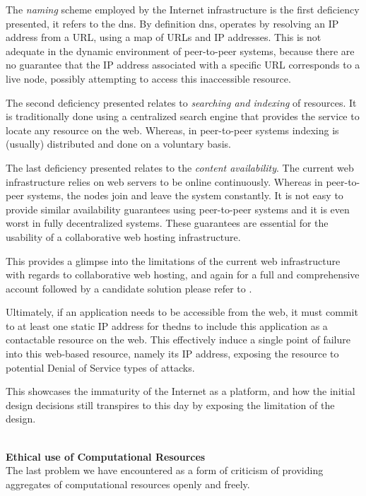 \documentclass[12pt, titlepage]{uo_temp}
\begin{document}
     The \emph{naming} scheme employed by the Internet infrastructure is the first
     deficiency presented, it refers to the \gls{dns}. By definition \gls{dns}, operates
     by resolving an IP address from a URL, using a map of URLs and IP addresses. This is
     not adequate in the dynamic environment of peer-to-peer systems, because there are no
     guarantee that the IP address associated with a specific URL corresponds to a live
     node, possibly attempting to access this inaccessible resource.

     The second deficiency presented relates to \emph{searching and indexing} of
     resources. It is traditionally done using a centralized search engine that provides
     the service to locate any resource on the web. Whereas, in peer-to-peer systems
     indexing is (usually) distributed and done on a voluntary basis.

     The last deficiency presented relates to the \emph{content availability}. The current
     web infrastructure relies on web servers to be online continuously.  Whereas in
     peer-to-peer systems, the nodes join and leave the system constantly. It is not easy
     to provide similar availability guarantees using peer-to-peer systems and it is even
     worst in fully decentralized systems. These guarantees are essential for the
     usability of a collaborative web hosting infrastructure.

     This provides a glimpse into the limitations of the current web infrastructure with
     regards to collaborative web hosting, and again for a full and comprehensive account
     followed by a candidate solution please refer to \cite{ahmed2014collaborative}.

     Ultimately, if an application needs to be accessible from the web, it must commit to
     at least one static IP address for the\gls{dns} to include this application as a
     contactable resource on the web. This effectively induce a single point of failure
     into this web-based resource, namely its IP address, exposing the resource to
     potential Denial of Service types of attacks.

     This showcases the immaturity of the Internet as a platform, and how the initial
     design decisions still transpires to this day by exposing the limitation of the
     design.

     \\ \textbf{Ethical use of Computational Resources}
     \\ The last problem we have encountered as a form of criticism of providing
     aggregates of computational resources openly and freely.
\end{document}
